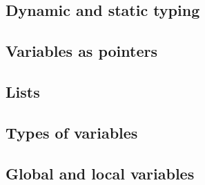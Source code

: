 

\subsection{Dynamic and static typing}

\subsection{Variables as pointers}

\subsection{Lists}

\subsection{Types of variables}

\subsection{Global and local variables}

